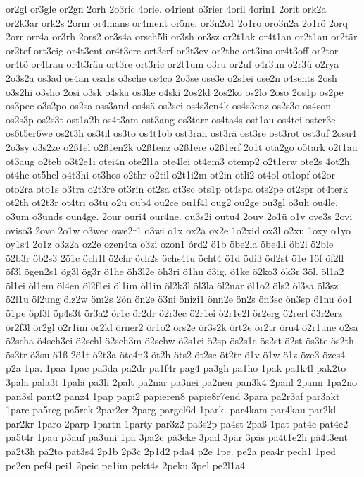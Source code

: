 {or2gl
or3gle
or2gn
2orh
2o3ric
4orie.
o4rient
o3rier
4oril
4orin1
2orit
ork2a
or2k3ar
ork2s
2orm
or4mans
or4ment
or5ne.
or3n2o1
2o1ro
oro3n2a
2o1rö
2orq
2orr
orr4a
or3rh
2ors2
or3s4a
orsch5li
or3sh
or3sz
or2t1ak
or4t1an
or2t1au
or2tär
or2tef
ort3eig
or4t3ent
or4t3ere
ort3erf
or2t3ev
or2the
ort3ins
or4t3off
or2tor
or4tö
or4trau
or4t3räu
ort3re
ort3ric
or2t1um
o3ru
or2uf
o4r3un
o2r3ü
o2rya
2o3s2a
os3ad
os4an
osa1s
o3sche
os4co
2o3se
ose3e
o2s1ei
ose2n
o4sents
2osh
o3s2hi
o3sho
2osi
o3sk
o4ska
os3ke
o4ski
2os2kl
2os2ko
os2lo
2oso
2os1p
os2pe
os3pec
o3s2po
os2sa
oss3and
os4sä
os2sei
os4s3en4k
os4s3enz
os2s3o
os4son
os2s3p
os2s3t
ost1a2b
os4t3am
ost3ang
os3tarr
os4ta4s
ost1au
os4tei
oster3e
os6t5er6we
os2t3h
os3til
os3to
os4t1ob
ost3ran
ost3rä
ost3re
ost3rot
ost3uf
2osu4
2o3sy
o3s2ze
o2ß1el
o2ß1en2k
o2ß1enz
o2ß1ere
o2ß1erf
2o1t
ota2go
o5tark
o2t1au
ot3aug
o2teb
o3t2e1i
otei4n
ote2l1a
ote4lei
ot4em3
otemp2
o2t1erw
ote2s
4ot2h
ot4he
ot5hel
o4t3hi
ot3hos
o2thr
o2til
o2t1i2m
ot2in
otli2
ot4ol
ot1opf
ot2or
oto2ra
oto1s
o3tra
o2t3re
ot3rin
ot2sa
ot3sc
ots1p
ot4spa
ots2pe
ot2spr
ot4terk
ot2th
ot2t3r
ot4tri
o3tü
o2u
oub4
ou2ce
ou1f4l
oug2
ou2ge
ou3gl
o3uh
ou4le.
o3um
o3unds
oun4ge.
2our
ouri4
our4ne.
ou3s2i
outu4
2ouv
2o1ü
o1v
ove3s
2ovi
oviso3
2ovo
2o1w
o3wec
owe2r1
o3wi
o1x
ox2a
ox2e
1o2xid
ox3l
o2xu
1oxy
o1yo
oy1s4
2o1z
o3z2a
oz2e
ozen4ta
o3zi
ozon1
órd2
ö1b
öbe2la
öbe4li
öb2l
ö2ble
ö2b3r
öb2s3
2ö1c
öch1l
ö2chr
öch2s
öchs4tu
öcht4
ö1d
ödi3
öd2st
ö1e
1öf
öf2fl
öf3l
ögen2s1
ög3l
ög3r
ö1he
öh3l2e
öh3ri
ö1hu
ö3ig.
ö1ke
ö2ko3
ök3r
3öl.
öl1a2
öl1ei
öl1em
öl4en
öl2f1ei
öl1im
öl1in
öl2k3l
öl3la
öl2nar
öl1o2
öls2
öl3sa
öl3sz
ö2l1u
öl2ung
ölz2w
öm2s
2ön
ön2e
ö3ni
önizi1
önn2e
ön2s
ön3sc
ön3sp
ö1nu
öo1
ö1pe
öpf3l
öp4s3t
ör3a2
ör1c
ör2dr
ö2r3ec
ö2r1ei
ö2r1e2l
ör2erg
ö2rerl
ö3r2erz
ör2f3l
ör2gl
ö2r1im
ör2kl
örner2
ör1o2
örs2e
ör3s2k
ört2e
ör2tr
öru4
ö2r1une
ö2sa
ö2scha
ö4sch3ei
ö2schl
ö2sch3m
ö2schw
ö2s1ei
ö2sp
ös2s1c
ös2st
ö2st
ös3te
ös2th
ös3tr
ö3su
ö1ß
2ö1t
ö2t3a
öte4n3
öt2h
öts2
öt2sc
öt2tr
ö1v
ö1w
ö1z
öze3
özes4
p2a
1pa.
1paa
1pac
pa3da
pa2dr
pa1f4r
pag4
pa3gh
pa1ho
1pak
pa1k4l
pak2to
3pala
pala3t
1palä
pa3li
2palt
pa2nar
pa3nei
pa2neu
pan3k4
2panl
2pann
1pa2no
pan3sl
pant2
panz4
1pap
papi2
papieren8
papie8r7end
3para
pa2r3af
par3akt
1parc
pa5reg
pa5rek
2par2er
2parg
pargel6d
1park.
par4kam
par4kau
par2kl
par2kr
1paro
2parp
1partn
1party
par3z2
pa3s2p
pa4st
2paß
1pat
pat4c
pat4e2
pa5t4r
1pau
p3auf
pa3uni
1pä
3pä2c
pä3cke
3päd
3pär
3päs
pä4t1e2h
pä4t3ent
pä2t3h
pä2to
pät3s4
2p1b
2p3c
2p1d2
pda4
p2e
1pe.
pe2a
pea4r
pech1
1ped
pe2en
pef4
pei1
2peic
pe1im
pekt4s
2peku
3pel
pe2l1a4
}
